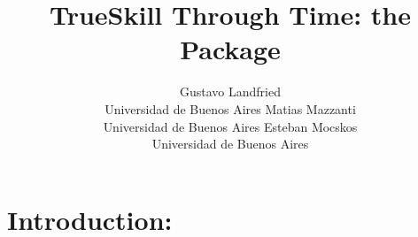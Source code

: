 \documentclass[article]{jss}
\author{Gustavo Landfried \\Universidad de Buenos Aires
   \And Matias Mazzanti \\Universidad de Buenos Aires
   \And Esteban Mocskos \\Universidad de Buenos Aires}
\title{TrueSkill Through Time: the \proglang{Python} Package}
\begin{document}
\lstset{language=Python}



\section[Introduction: Count data regression in R]{Introduction: } \label{sec:intro}
\end{document}
